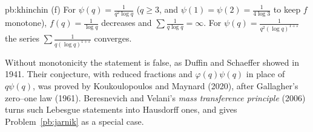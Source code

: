\begin{solution}{pb:khinchin}
(f) For $\psi(q)=\frac1{q^2\log q}$ ($q\ge3$, and $\psi(1)=\psi(2)=\frac1{4\log3}$ to keep $f$ monotone), $f(q)=\frac1{\log q}$ decreases and $\sum\frac1{q\log q}=\infty$.
For $\psi(q)=\frac1{q^2(\log q)^{1+\varepsilon}}$ the series $\sum\frac1{q(\log q)^{1+\varepsilon}}$ converges.

\leads Without monotonicity the statement is false, as Duffin and Schaeffer showed in 1941. Their conjecture, with reduced fractions and $\varphi(q)\psi(q)$ in place of
$q\psi(q)$, was proved by Koukoulopoulos and Maynard (2020), after Gallagher's zero--one law (1961). Beresnevich and Velani's \emph{mass transference principle}
(2006) turns such Lebesgue statements into Hausdorff ones, and gives Problem~\ref{pb:jarnik} as a special case.
\end{solution}

